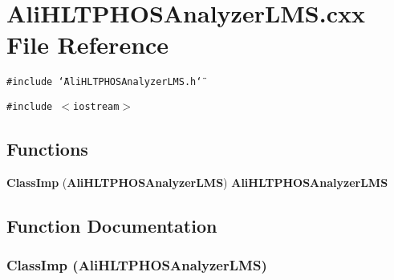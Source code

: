 \section{Ali\-HLTPHOSAnalyzer\-LMS.cxx File Reference}
\label{AliHLTPHOSAnalyzerLMS_8cxx}
{\tt \#include \char`\"{}Ali\-HLTPHOSAnalyzer\-LMS.h\char`\"{}}\par
{\tt \#include $<$iostream$>$}\par
\subsection*{Functions}
\begin{CompactItemize}
\item 
{\bf Class\-Imp} ({\bf Ali\-HLTPHOSAnalyzer\-LMS}) {\bf Ali\-HLTPHOSAnalyzer\-LMS}
\end{CompactItemize}


\subsection{Function Documentation}
\subsubsection{\setlength{\rightskip}{0pt plus 5cm}Class\-Imp ({\bf Ali\-HLTPHOSAnalyzer\-LMS})}\label{AliHLTPHOSAnalyzerLMS_8cxx_a0}


